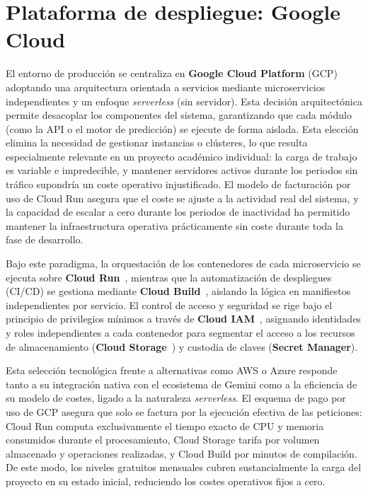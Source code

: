 \section{Plataforma de despliegue: Google Cloud}
El entorno de producción se centraliza en \textbf{Google Cloud Platform} (GCP) adoptando una arquitectura 
orientada a servicios mediante microservicios independientes y un enfoque \textit{serverless} (sin servidor). 
Esta decisión arquitectónica permite desacoplar los componentes del sistema, garantizando que cada módulo 
(como la API o el motor de predicción) se ejecute de forma aislada. Esta elección elimina la necesidad de 
gestionar instancias o clústeres, lo que resulta especialmente relevante en un proyecto académico individual: la carga
de trabajo es variable e impredecible, y mantener servidores activos durante
los periodos sin tráfico supondría un coste operativo injustificado. El modelo
de facturación por uso de Cloud Run asegura que el coste se ajuste a la
actividad real del sistema, y la capacidad de escalar a cero durante los
periodos de inactividad ha permitido mantener la infraestructura operativa
prácticamente sin coste durante toda la fase de desarrollo.

Bajo este paradigma, la orquestación de los contenedores de cada microservicio se ejecuta sobre \textbf{Cloud Run}~\cite{cloud_run2026}, mientras que la automatización de despliegues (CI/CD) se gestiona mediante \textbf{Cloud Build}~\cite{cloud_build2026}, aislando la lógica en manifiestos independientes por servicio. El control de acceso y seguridad se rige bajo el principio de privilegios mínimos a través de \textbf{Cloud IAM}~\cite{gcp_products2026}, asignando identidades y roles independientes a cada contenedor para segmentar el acceso a los recursos de almacenamiento (\textbf{Cloud Storage}~\cite{cloud_storage2026}) y custodia de claves (\textbf{Secret Manager}).

Esta selección tecnológica frente a alternativas como AWS o Azure responde tanto a su integración nativa con el ecosistema de Gemini como a la eficiencia de su modelo de costes, ligado a la naturaleza \textit{serverless}. El esquema de pago por uso de GCP asegura que solo se factura por la ejecución efectiva de las peticiones: Cloud Run computa exclusivamente el tiempo exacto de CPU y memoria consumidos durante el procesamiento, Cloud Storage tarifa por volumen almacenado y operaciones realizadas, y Cloud Build por minutos de compilación. De este modo, los niveles gratuitos mensuales cubren sustancialmente la carga del proyecto en su estado inicial, reduciendo los costes operativos fijos a cero.

